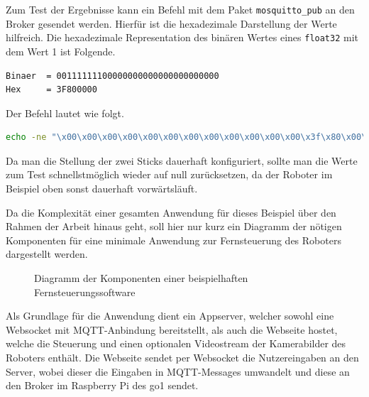 Zum Test der Ergebnisse kann ein Befehl mit dem Paket \texttt{mosquitto\_pub} an den Broker gesendet werden.
Hierfür ist die hexadezimale Darstellung der Werte hilfreich.
Die hexadezimale Representation des binären Wertes eines \texttt{float32} mit dem Wert \num{1} ist Folgende.

\begin{lstlisting}[language=Bash]
Binaer  = 00111111100000000000000000000000
Hex     = 3F800000
\end{lstlisting}

\noindent Der Befehl lautet wie folgt.

\begin{lstlisting}[language=Bash]
echo -ne "\x00\x00\x00\x00\x00\x00\x00\x00\x00\x00\x00\x00\x3f\x80\x00\x00" | mosquitto_pub -h 192.168.123.161 -t controller/stick -s
\end{lstlisting}

\noindent Da man die Stellung der zwei Sticks dauerhaft konfiguriert, sollte man die Werte zum Test schnellstmöglich
wieder auf null zurücksetzen, da der Roboter im Beispiel oben sonst dauerhaft vorwärtsläuft.


Da die Komplexität einer gesamten Anwendung für dieses Beispiel über den Rahmen der Arbeit hinaus geht, soll hier nur kurz
ein Diagramm der nötigen Komponenten für eine minimale Anwendung zur Fernsteuerung des Roboters dargestellt werden.

\begin{figure}[h]
    \caption{Diagramm der Komponenten einer beispielhaften Fernsteuerungssoftware}\label{fig:remote}
\end{figure}

\noindent Als Grundlage für die Anwendung dient ein Appserver, welcher sowohl eine Websocket mit MQTT-Anbindung bereitstellt,
als auch die Webseite hostet, welche die Steuerung und einen optionalen Videostream der Kamerabilder des Roboters enthält.
Die Webseite sendet per Websocket die Nutzereingaben an den Server, wobei dieser die Eingaben in MQTT-Messages umwandelt
und diese an den Broker im Raspberry Pi des \gls{go1} sendet.

